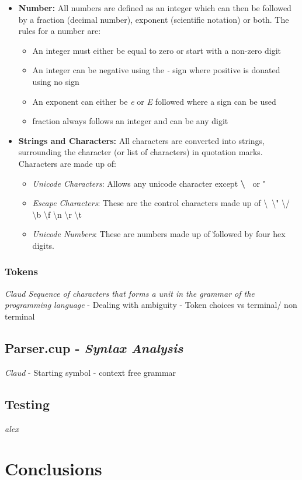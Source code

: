 \begin{itemize}
\tightlist
\item
  \textbf{Number:} All numbers are defined as an integer which can then
  be followed by a fraction (decimal number), exponent (scientific
  notation) or both. The rules for a number are:

  \begin{itemize}
  \tightlist
  \item
    An integer must either be equal to zero or start with a non-zero
    digit
  \item
    An integer can be negative using the \emph{-} sign where positive is
    donated using no sign
  \item
    An exponent can either be \emph{e} or \emph{E} followed where a sign
    can be used
  \item
    fraction always follows an integer and can be any digit
  \end{itemize}
\item
  \textbf{Strings and Characters:} All characters are converted into
  strings, surrounding the character (or list of characters) in
  quotation marks. Characters are made up of:

  \begin{itemize}
  \tightlist
  \item
    \emph{Unicode Characters}: Allows any unicode character except
    \textbf{\textbackslash{}~} or "
  \item
    \emph{Escape Characters}: These are the control characters made up
    of \textbackslash{}~\textbackslash{}" \textbackslash{}/
    \textbackslash{}b \textbackslash{}f \textbackslash{}n
    \textbackslash{}r \textbackslash{}t
  \item
    \emph{Unicode Numbers}: These are numbers made up of \u followed by
    four hex digits.
  \end{itemize}
\end{itemize}

\subsubsection{Tokens}\label{tokens}

\emph{Claud Sequence of characters that forms a unit in the grammar of
the programming language} - Dealing with ambiguity - Token choices vs
terminal/ non terminal

\subsection{\texorpdfstring{Parser.cup - \emph{Syntax
Analysis}}{Parser.cup - Syntax Analysis}}\label{parser.cup---syntax-analysis}

\emph{Claud} - Starting symbol - context free grammar

\subsection{Testing}\label{testing}

\emph{alex}

\section{Conclusions}\label{conclusions}
